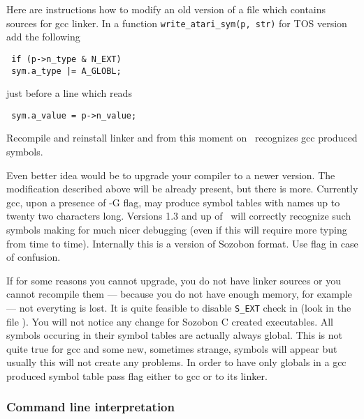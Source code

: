 Here are instructions how to modify an old version of a
file  which contains sources
for gcc linker. In a function \verb|write_atari_sym(p, str)| for TOS version
add the following
\begin{exmpl}
	\verb? if (p->n_type & N_EXT)?\\
	\makebox[1.5cm]{}\verb? sym.a_type |= A_GLOBL;?
\end{exmpl}
just before a line which reads
\begin{exmpl}
	\verb? sym.a_value = p->n_value;?
\end{exmpl}
Recompile and reinstall linker and from this moment on \szadb\
recognizes gcc produced symbols.

Even better idea would be to upgrade your compiler to a newer version.
The modification described above will be already present, but there is
more.
Currently gcc, upon a presence of -G flag, may produce symbol tables
with names up to twenty two characters long.  Versions 1.3 and up of \szadb\
will correctly recognize such symbols making for much nicer debugging
(even if this will require more typing from time to time).  Internally
this is a version of Sozobon format.  Use \name{-os} flag in case
of confusion.

If for some reasons you cannot upgrade, 
you do not have linker sources or you cannot recompile them ---
because you do not have enough memory, for example --- not everyting is
lost.  It is quite feasible to disable \verb|S_EXT| check in 
(look in the file \name{adb1.c}).  
You will not notice any change for Sozobon C created executables.
All symbols occuring in their symbol tables are actually always global.
This is not quite true for gcc and some new, sometimes strange, symbols
will appear but usually this will not create any problems.
In order to have only globals in a gcc produced symbol table
pass \name{-x} flag either to gcc or to its linker.

\subsubsection{Command line interpretation}

